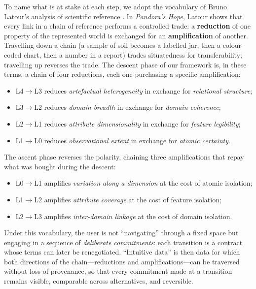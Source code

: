 \documentclass[12pt,a4paper]{article}
\begin{document}
\noindent To name what is at stake at each step, we adopt the vocabulary of Bruno Latour's analysis of scientific reference \citep{latour1999}. In \textit{Pandora's Hope}, Latour shows that every link in a chain of reference performs a controlled trade: a \textbf{reduction} of one property of the represented world is exchanged for an \textbf{amplification} of another. Travelling down a chain (a sample of soil becomes a labelled jar, then a colour-coded chart, then a number in a report) trades situatedness for transferability; travelling up reverses the trade. The descent phase of our framework is, in these terms, a chain of four reductions, each one purchasing a specific amplification:
\begin{itemize}[leftmargin=2em,itemsep=0.2em]
\item L4$\to$L3 reduces \textit{artefactual heterogeneity} in exchange for \textit{relational structure};
\item L3$\to$L2 reduces \textit{domain breadth} in exchange for \textit{domain coherence};
\item L2$\to$L1 reduces \textit{attribute dimensionality} in exchange for \textit{feature legibility};
\item L1$\to$L0 reduces \textit{observational extent} in exchange for \textit{atomic certainty}.
\end{itemize}
The ascent phase reverses the polarity, chaining three amplifications that repay what was bought during the descent:
\begin{itemize}[leftmargin=2em,itemsep=0.2em]
\item L0$\to$L1 amplifies \textit{variation along a dimension} at the cost of atomic isolation;
\item L1$\to$L2 amplifies \textit{attribute coverage} at the cost of feature isolation;
\item L2$\to$L3 amplifies \textit{inter-domain linkage} at the cost of domain isolation.
\end{itemize}
Under this vocabulary, the user is not ``navigating'' through a fixed space but engaging in a sequence of \emph{deliberate commitments}: each transition is a contract whose terms can later be renegotiated. ``Intuitive data'' is then data for which both directions of the chain---reductions and amplifications---can be traversed without loss of provenance, so that every commitment made at a transition remains visible, comparable across alternatives, and reversible.

\vspace{1em}
\end{document}
